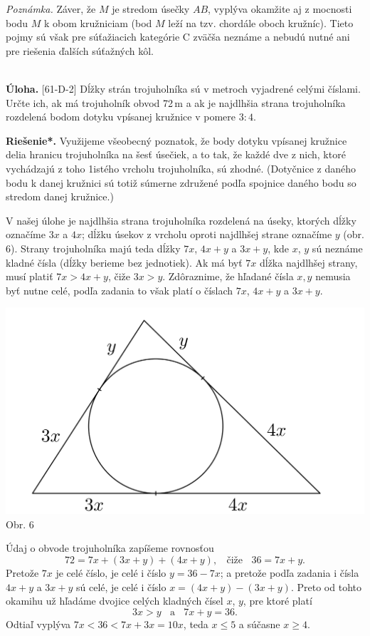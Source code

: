 \documentclass[11pt,a4paper,oneside,final]{book}
\newcommand{\ul}{\textbf{Úloha.} }
\newcommand{\rieh}{\textbf{Riešenie*.} }
\begin{document}
\textit{Poznámka.} Záver, že $M$ je stredom úsečky $AB$, vyplýva okamžite aj z mocnosti bodu $M$ k obom kružniciam (bod $M$ leží na tzv. chordále oboch kružníc). Tieto pojmy sú však pre súťažiacich kategórie C zväčša neznáme a nebudú nutné ani pre riešenia ďalších súťažných kôl.\\
\\
\begin{tcolorbox}[breakable,notitle,boxrule=0pt,colback=light-gray,colframe=light-gray]\ul [61-D-2] Dĺžky strán trojuholníka sú v metroch vyjadrené celými číslami. Určte ich, ak má trojuholník obvod 72\,m a ak je najdlhšia strana trojuholníka rozdelená bodom dotyku vpísanej kružnice v pomere $3 : 4.$

\end{tcolorbox}

\rieh Využijeme všeobecný poznatok, že body dotyku vpísanej kružnice delia hranicu trojuholníka na šesť úsečiek, a to tak, že každé dve z nich, ktoré vychádzajú z toho 1istého vrcholu trojuholníka, sú zhodné. (Dotyčnice z daného bodu k danej kružnici sú totiž súmerne združené podľa spojnice daného bodu so stredom danej kružnice.)

V našej úlohe je najdlhšia strana trojuholníka rozdelená na úseky, ktorých dĺžky označíme $3x$ a $4x$; dĺžku úsekov z vrcholu oproti najdlhšej strane označíme $y$ (obr. 6). Strany trojuholníka majú teda dĺžky $7x$, $4x + y$ a $3x + y$, kde $x$, $y$ sú neznáme kladné čísla (dĺžky berieme bez jednotiek). Ak má byť $7x$ dĺžka najdlhšej strany, musí platiť $7x > 4x + y$, čiže $3x > y$. Zdôraznime, že hľadané čísla $x, y$ nemusia byť nutne celé, podľa zadania to však platí o číslach $7x$, $4x + y$ a $3x + y$.
\begin{center}
\includegraphics{61D1}\\

Obr. 6
\end{center}
Údaj o obvode trojuholníka zapíšeme rovnosťou
$$72 = 7x + (3x + y) + (4x + y), \ \ \ \ \text{čiže} \ \ \ \ 36 = 7x + y.$$
Pretože $7x$ je celé číslo, je celé i číslo $y = 36 - 7x$; a pretože podľa zadania i čísla $4x + y$ a $3x + y$ sú celé, je celé i číslo $x = (4x + y) - (3x + y)$. Preto od tohto okamihu už hľadáme dvojice celých kladných čísel $x$, $y$, pre ktoré platí
$$3x > y \ \ \ \ \text{a}  \ \ \ \ 7x + y = 36.$$
Odtiaľ vyplýva $7x < 36 < 7x + 3x = 10x$, teda $x \leq 5$ a súčasne $x \geq 4$.
\end{document}
